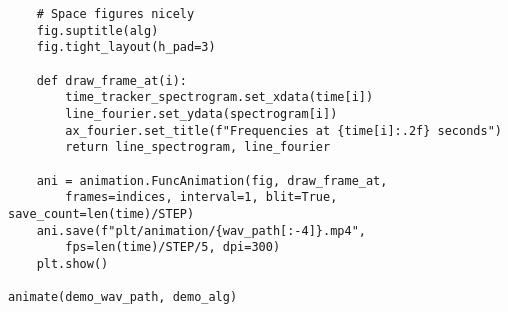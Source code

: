 \begin{verbatim}
    # Space figures nicely
    fig.suptitle(alg)
    fig.tight_layout(h_pad=3)

    def draw_frame_at(i):
        time_tracker_spectrogram.set_xdata(time[i])
        line_fourier.set_ydata(spectrogram[i])
        ax_fourier.set_title(f"Frequencies at {time[i]:.2f} seconds")
        return line_spectrogram, line_fourier

    ani = animation.FuncAnimation(fig, draw_frame_at,
        frames=indices, interval=1, blit=True, save_count=len(time)/STEP)
    ani.save(f"plt/animation/{wav_path[:-4]}.mp4",
        fps=len(time)/STEP/5, dpi=300)
    plt.show()

animate(demo_wav_path, demo_alg)
\end{verbatim}

